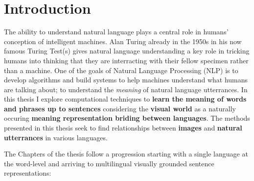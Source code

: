 

\chapter{Introduction}
\label{ch:introduction}

The ability to understand natural language plays a central role in humans' conception of intelligent machines.
Alan Turing already in the 1950s in his now famous Turing Test(s) gives natural language understanding a 
key role in tricking humans into thinking that they are interracting with their fellow specimen rather 
than a machine. One of the goals of Natural Language Processing (NLP) is to develop algorithms
and build systems to help machines understand what humans are talking about; to 
understand the \emph{meaning} of natural language utterrances. 
In this thesis I explore computational techniques to 
\textbf{learn the meaning of words and phrases up to sentences}
considering the \textbf{visual world} as a naturally occuring 
\textbf{meaning representation briding between languages}. 
The methods presented in this thesis seek to find relationships between \textbf{images} and 
\textbf{natural utterrances} in various languages. 


The  Chapters of the thesis follow a progression 
starting with a single language at the word-level and arriving to multilingual visually grounded sentence
representations:

